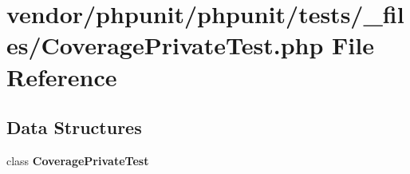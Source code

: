 \section{vendor/phpunit/phpunit/tests/\+\_\+files/\+Coverage\+Private\+Test.php File Reference}
\label{phpunit_2tests_2__files_2_coverage_private_test_8php}
\subsection*{Data Structures}
\begin{DoxyCompactItemize}
\item 
class {\bf Coverage\+Private\+Test}
\end{DoxyCompactItemize}
